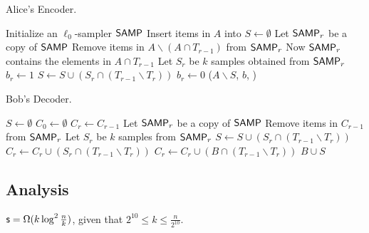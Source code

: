 \begin{algorithm}[H] 
  \caption{Alice's Encoder.} \label{algo:enc4}
  \begin{algorithmic}[1]
    \State Initialize an $\ell_0$-sampler $\textsf{SAMP}$
    \State Insert items in $A$ into \samp
    \State $S\leftarrow \emptyset$
    \State Let $\textsf{SAMP}_r$ be a copy of $\textsf{SAMP}$
    \State Remove items in $A\backslash (A\cap T_{r-1})$ from $\textsf{SAMP}_r$ \Comment Now $\textsf{SAMP}_r$ contains the elements in $A\cap T_{r-1}$
    \State Let $S_r$ be $k$ samples obtained from $\textsf{SAMP}_r$
     
      \State $b_r\leftarrow 1$ 
      \State $S\leftarrow S \cup (S_r\cap (T_{r-1}\backslash T_r))$
    \Else 
      \State $b_r\leftarrow 0$
    \EndIf
    \EndFor
      \State \Return ($A\backslash S$, $b$, \samp) 
    \EndProcedure
  \end{algorithmic}
\end{algorithm}

\begin{algorithm}[H] 
  \caption{Bob's Decoder.} \label{algo:dec4}
  \begin{algorithmic}[1]
    \State $S\leftarrow \emptyset$
    \State $C_0 \leftarrow \emptyset$
      \State $C_r\leftarrow C_{r-1}$
        \State Let $\textsf{SAMP}_r$ be a copy of $\textsf{SAMP}$
        \State Remove items in $C_{r-1}$ from $\textsf{SAMP}_r$ 
        \State Let $S_r$ be $k$ samples from $\textsf{SAMP}_r$
        \State $S\leftarrow S \cup (S_r\cap (T_{r-1}\backslash T_r))$
        \State $C_r\leftarrow C_r \cup (S_r\cap (T_{r-1}\backslash T_r))$
      \EndIf
      \State $C_r\leftarrow C_r \cup (B\cap (T_{r-1}\backslash T_r))$
    \EndFor
    \State \Return $B\cup S$ 
    \EndProcedure
  \end{algorithmic}
\end{algorithm}

\subsection{Analysis}

\begin{theorem}
  $\textsf{s} = \Omega(k\log^2 \frac{n}{k} )$, given that $2^{10} \le k \le \frac{n}{2^{10}}$.
\end{theorem}

